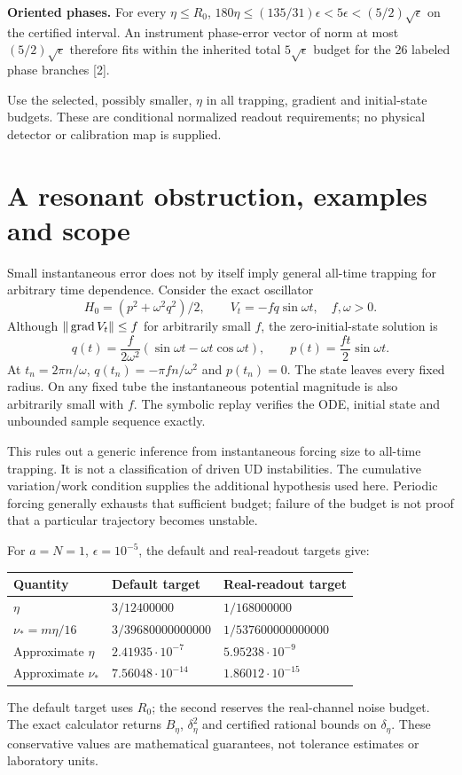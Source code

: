 \documentclass[11pt,a4paper]{article}
\begin{document}
\textbf{Oriented phases.} For every $\eta\le R_0$, $180\eta\le(135/31)\epsilon<5\epsilon<(5/2)\sqrt\epsilon$ on the certified interval. An instrument phase-error vector of norm at most $(5/2)\sqrt\epsilon$ therefore fits within the inherited total $5\sqrt\epsilon$ budget for the 26 labeled phase branches [2].

Use the selected, possibly smaller, $\eta$ in all trapping, gradient and initial-state budgets. These are conditional normalized readout requirements; no physical detector or calibration map is supplied.
\newpage
\section{A resonant obstruction, examples and scope}
Small instantaneous error does not by itself imply general all-time trapping for arbitrary time dependence. Consider the exact oscillator
\[
H_0=(p^2+\omega^2q^2)/2,\qquad V_t=-f q\sin\omega t,\quad f,\omega>0.
\]
Although $\|\operatorname{grad} V_t\|\le f$ for arbitrarily small $f$, the zero-initial-state solution is
\[
q(t)=\frac f{2\omega^2}(\sin\omega t-\omega t\cos\omega t),\qquad
p(t)=\frac{ft}{2}\sin\omega t.
\]
At $t_n=2\pi n/\omega$, $q(t_n)=-\pi fn/\omega^2$ and $p(t_n)=0$. The state leaves every fixed radius. On any fixed tube the instantaneous potential magnitude is also arbitrarily small with $f$. The symbolic replay verifies the ODE, initial state and unbounded sample sequence exactly.

This rules out a generic inference from instantaneous forcing size to all-time trapping. It is not a classification of driven UD instabilities. The cumulative variation/work condition supplies the additional hypothesis used here. Periodic forcing generally exhausts that sufficient budget; failure of the budget is not proof that a particular trajectory becomes unstable.

For $a=N=1$, $\epsilon=10^{-5}$, the default and real-readout targets give:
\begin{center}\begin{tabular}{lll}
\toprule
Quantity & Default target & Real-readout target\\\midrule
$\eta$ & $3/12400000$ & $1/168000000$\\
$\nu_*=m\eta/16$ & $3/39680000000000$ & $1/537600000000000$\\
Approximate $\eta$ & $2.41935\cdot10^{-7}$ & $5.95238\cdot10^{-9}$\\
Approximate $\nu_*$ & $7.56048\cdot10^{-14}$ & $1.86012\cdot10^{-15}$\\\bottomrule
\end{tabular}\end{center}
The default target uses $R_0$; the second reserves the real-channel noise budget. The exact calculator returns $B_\eta$, $\delta_\eta^2$ and certified rational bounds on $\delta_\eta$. These conservative values are mathematical guarantees, not tolerance estimates or laboratory units.
\end{document}
